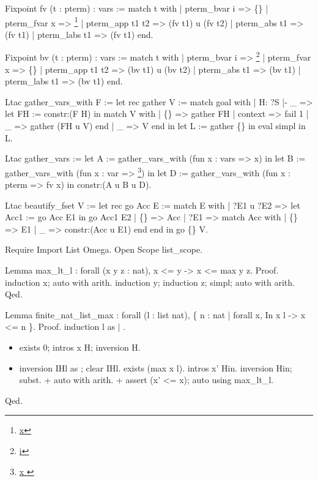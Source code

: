 Fixpoint fv (t : pterm) : vars :=
  match t with
  | pterm\_bvar i    => \{\}
  | pterm\_fvar x    => \footnote{\url{x}}
  | pterm\_app t1 t2 => (fv t1) u (fv t2)
  | pterm\_abs t1    => (fv t1)
  | pterm\_labs t1    => (fv t1)
  end.


Fixpoint bv (t : pterm) : vars :=
  match t with
  | pterm\_bvar i    => \footnote{\url{i}}
  | pterm\_fvar x    => \{\}
  | pterm\_app t1 t2 => (bv t1) u (bv t2)
  | pterm\_abs t1    => (bv t1)
  | pterm\_labs t1    => (bv t1)
  end.


Ltac gather\_vars\_with F :=
  let rec gather V :=
    match goal with
    | H: ?S |- \_ =>
      let FH := constr:(F H) in
      match V with
      | \{\} => gather FH
      | context  => fail 1
      | \_ => gather (FH u V)
      end
    | \_ => V
    end in
  let L := gather \{\} in eval simpl in L.


Ltac gather\_vars :=
  let A := gather\_vars\_with (fun x : vars => x) in
  let B := gather\_vars\_with (fun x : var => \footnote{\url{ x }}) in
  let D := gather\_vars\_with (fun x : pterm => fv x) in
  constr:(A u B u D).


Ltac beautify\_fset V :=
  let rec go Acc E :=
     match E with
     | ?E1 u ?E2 => let Acc1 := go Acc E1 in
                     go Acc1 E2
     | \{\}  => Acc
     | ?E1 => match Acc with
              | \{\} => E1
              | \_ => constr:(Acc u E1)
              end
     end
  in go \{\} V.


Require Import List Omega.
Open Scope list\_scope.


Lemma max\_lt\_l :
  forall (x y z : nat), x <= y -> x <= max y z.
Proof.
  induction x; auto with arith.
  induction y; induction z; simpl; auto with arith.
Qed.


Lemma finite\_nat\_list\_max : forall (l : list nat),
  \{ n : nat | forall x, In x l -> x <= n \}.
Proof.
  induction l as  \ensuremath{|}    .

\begin{itemize}
\item  exists 0; intros x H; inversion H.

\item  inversion IHl as  ; clear IHl.
    exists (max x l).
    intros x' Hin.
    inversion Hin; subst.
    + auto with arith.
    + assert (x' <= x); auto using max\_lt\_l.

\end{itemize}
Qed.      


